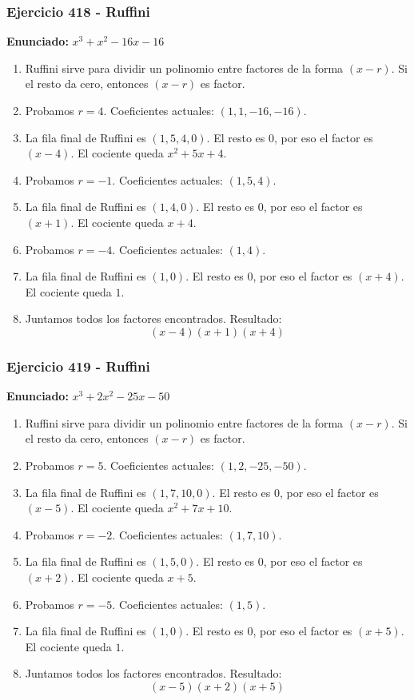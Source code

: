 \documentclass[11pt,a4paper]{article}
\begin{document}
\vspace{0.2cm}
\subsubsection*{Ejercicio 418 - Ruffini}
\textbf{Enunciado:} $ x^{3} + x^{2} - 16 x - 16 $\par
\begin{enumerate}[leftmargin=2em]
\item Ruffini sirve para dividir un polinomio entre factores de la forma \((x-r)\). Si el resto da cero, entonces \((x-r)\) es factor.
\item Probamos \(r=4\). Coeficientes actuales: \((1, 1, -16, -16)\).
\item La fila final de Ruffini es \((1, 5, 4, 0)\). El resto es \(0\), por eso el factor es \((x-4)\). El cociente queda \(x^{2} + 5 x + 4\).
\item Probamos \(r=-1\). Coeficientes actuales: \((1, 5, 4)\).
\item La fila final de Ruffini es \((1, 4, 0)\). El resto es \(0\), por eso el factor es \((x+1)\). El cociente queda \(x + 4\).
\item Probamos \(r=-4\). Coeficientes actuales: \((1, 4)\).
\item La fila final de Ruffini es \((1, 0)\). El resto es \(0\), por eso el factor es \((x+4)\). El cociente queda \(1\).
\item Juntamos todos los factores encontrados. Resultado: \[\boxed{\left(x - 4\right) \left(x + 1\right) \left(x + 4\right)}\]
\end{enumerate}

\vspace{0.2cm}
\subsubsection*{Ejercicio 419 - Ruffini}
\textbf{Enunciado:} $ x^{3} + 2 x^{2} - 25 x - 50 $\par
\begin{enumerate}[leftmargin=2em]
\item Ruffini sirve para dividir un polinomio entre factores de la forma \((x-r)\). Si el resto da cero, entonces \((x-r)\) es factor.
\item Probamos \(r=5\). Coeficientes actuales: \((1, 2, -25, -50)\).
\item La fila final de Ruffini es \((1, 7, 10, 0)\). El resto es \(0\), por eso el factor es \((x-5)\). El cociente queda \(x^{2} + 7 x + 10\).
\item Probamos \(r=-2\). Coeficientes actuales: \((1, 7, 10)\).
\item La fila final de Ruffini es \((1, 5, 0)\). El resto es \(0\), por eso el factor es \((x+2)\). El cociente queda \(x + 5\).
\item Probamos \(r=-5\). Coeficientes actuales: \((1, 5)\).
\item La fila final de Ruffini es \((1, 0)\). El resto es \(0\), por eso el factor es \((x+5)\). El cociente queda \(1\).
\item Juntamos todos los factores encontrados. Resultado: \[\boxed{\left(x - 5\right) \left(x + 2\right) \left(x + 5\right)}\]
\end{enumerate}
\end{document}
